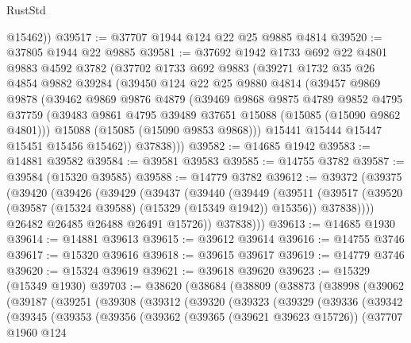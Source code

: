 \begin{lexlean}{RustStd}
\begin{coremodule}
        @15462))
@39517 := @37707 @1944 @124 @22 @25 @9885 @4814
@39520 := @37805 @1944 @22 @9885
@39581 := @37692
    @1942
    @1733
    @692
    @22
    @4801
    @9883
    @4592
    @3782
    (@37702
      @1733
      @692
      @9883
      (@39271
        @1732
        @35
        @26
        @4854
        @9882
        @39284
        (@39450
          @124
          @22
          @25
          @9880
          @4814
          (@39457
            @9869
            @9878
            (@39462
              @9869
              @9876
              @4879
              (@39469
                @9868
                @9875
                @4789
                @9852
                @4795
                @37759
                (@39483 @9861 @4795 @39489 @37651 @15088 (@15085 (@15090 @9862 @4801)))
                @15088
                (@15085 (@15090 @9853 @9868)))
              @15441
              @15444
              @15447
              @15451
              @15456
              @15462))
          @37838)))
@39582 := @14685 @1942
@39583 := @14881 @39582
@39584 := @39581 @39583
@39585 := @14755 @3782
@39587 := @39584 (@15320 @39585)
@39588 := @14779 @3782
@39612 := @39372
    (@39375
      (@39420
        (@39426
          (@39429
            (@39437
              (@39440
                (@39449
                  (@39511
                    (@39517
                      (@39520 (@39587 (@15324 @39588) (@15329 (@15349 @1942)) @15356))
                      @37838))))
              @26482
              @26485
              @26488
              @26491
              @15726))
          @37838)))
@39613 := @14685 @1930
@39614 := @14881 @39613
@39615 := @39612 @39614
@39616 := @14755 @3746
@39617 := @15320 @39616
@39618 := @39615 @39617
@39619 := @14779 @3746
@39620 := @15324 @39619
@39621 := @39618 @39620
@39623 := @15329 (@15349 @1930)
@39703 := @38620
    (@38684
      (@38809
        (@38873
          (@38998
            (@39062
              (@39187
                (@39251
                  (@39308
                    (@39312
                      (@39320
                        (@39323
                          (@39329
                            (@39336
                              (@39342
                                (@39345
                                  (@39353
                                    (@39356
                                      (@39362
                                        (@39365 (@39621 @39623 @15726))
                                        (@37707
                                          @1960
                                          @124

\end{coremodule}
\end{lexlean}
